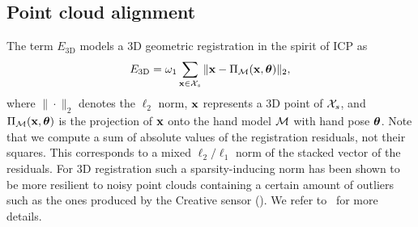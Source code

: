 %
%
%
%
%


\subsection*{Point cloud alignment}
The term $E_{\text{3D}}$ models a 3D geometric registration in the spirit of ICP as
%
\begin{equation}
    E_{\text{3D}}  = \omega_1 \sum_{\mathbf{x} \in \mathcal{X}_{s}} \| \mathbf{x} - \Pi_{\mathcal{M}}(\mathbf{x},\boldsymbol{\theta}) \|_2,
\label{eq:align3d}
\end{equation}
%
where $\|\cdot\|_2$ denotes the $\ell_2$ norm, $\mathbf{x}$ represents a 3D point of $\mathcal{X}_{s}$, and $\Pi_{\mathcal{M}}(\mathbf{x},\boldsymbol{\theta})$ is the projection of $\mathbf{x}$ onto the hand model $\mathcal{M}$ with hand pose $\boldsymbol{\theta}$. 
%
 Note that we compute a sum of absolute values of the registration residuals, not their squares. This corresponds to a mixed $\ell_{2}/\ell_{1}$ norm of the stacked vector of the residuals. For 3D registration such a sparsity-inducing norm has been shown to be more resilient to noisy point clouds containing a certain amount of outliers
such as the ones produced by the Creative sensor (). We refer to~\cite{bouaziz_sgp13} for more details.

